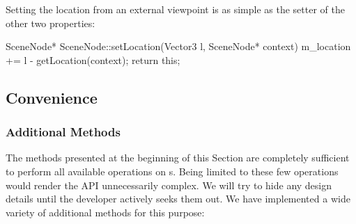 			Setting the location from an external viewpoint is as simple as the setter of the other two properties:
			
			\begin{code}[4]
				SceneNode* SceneNode::setLocation(Vector3 l, SceneNode* context) {
					m_location += l - getLocation(context);
				    return this;
				}
			\end{code}

	\subsection{Convenience}

		\subsubsection{Additional Methods}

			The methods presented at the beginning of this Section are completely sufficient to perform all available operations on s. Being limited to these few operations would render the API unnecessarily complex. We will try to hide any design details until the developer actively seeks them out. We have implemented a wide variety of additional methods for this purpose:

